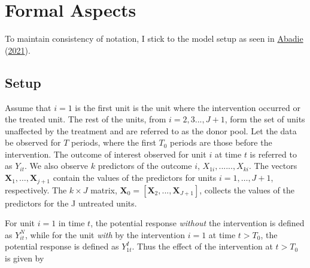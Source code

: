 \documentclass[12pt,nobind, a4paper]{reedthesis}
\begin{document}
 \hypertarget{fmr}{%
 \section{Formal Aspects}\label{fmr}}

 To maintain consistency of notation, I stick to the model setup as seen in \protect\hyperlink{ref-abadie_using_2021}{Abadie} (\protect\hyperlink{ref-abadie_using_2021}{2021}).

 \hypertarget{setup}{%
 \subsection{Setup}\label{setup}}

 Assume that \(i=1\) is the first unit is the unit where the intervention occurred or the treated unit. The rest of the units, from \(i=2,3...,J+1\), form the set of units unaffected by the treatment and are referred to as the donor pool. Let the data be observed for \(T\) periods, where the first \(T_0\) periods are those before the intervention. The outcome of interest observed for unit \(i\) at time \(t\) is referred to as \(Y_{it}\). We also observe \(k\) predictors of the outcome \(i\), \(X_{1i},......,X_{ki}\). The vectors \(\mathbf{X}_{1},…,\mathbf{X}_{j+1}\) contain the values of the predictors for units \(i = 1,…,J + 1\), respectively. The \(k \times J\) matrix, \(\mathbf{X}_{0} = [\mathbf{X}_{2},..., \mathbf{X}_{J+1}]\), collects the values of the predictors for the J untreated units.
 \linebreak

 For unit \(i=1\) in time \(t\), the potential response \emph{without} the intervention is defined as \(Y^{N}_{it}\), while for the unit \emph{with} by the intervention \(i=1\) at time \(t>T_0\), the potential response is defined as \(Y^{I}_{1t}\). Thus the effect of the intervention at \(t>T_0\) is given by
\end{document}
